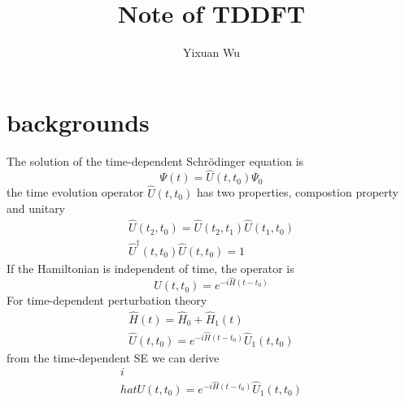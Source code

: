 \documentclass[11pt]{article}
\title{Note of TDDFT}
\author{Yixuan Wu}
\begin{document}
\maketitle
\section{backgrounds}
The solution of the time-dependent Schr\"odinger equation is
\begin{equation}
    \Psi(t)=\hat{U}(t,t_0)\Psi_0
\end{equation}
the time evolution operator $\hat{U}(t,t_0)$ has two properties, compostion property and unitary
\begin{gather}
    \hat{U}(t_2,t_0)=\hat{U}(t_2,t_1)\hat{U}(t_1,t_0)\\
    {\hat{U}}^\dagger(t,t_0)\hat{U}(t,t_0)=1
\end{gather}
If the Hamiltonian is independent of time, the operator is
\begin{equation}
    \hat{U}(t,t_0)=e^{-i\hat{H}(t-t_0)}
\end{equation}
For time-dependent perturbation theory
\begin{gather}
    \hat{H}(t)=\hat{H}_0+\hat{H}_1(t)\\
    \hat{U}(t,t_0)=e^{-i\hat{H}(t-t_0)}\hat{U}_1(t,t_0)
\end{gather}
from the time-dependent SE we can derive
\begin{gather}
    i\\hat{U}(t,t_0)=e^{-i\hat{H}(t-t_0)}\hat{U}_1(t,t_0)
\end{gather}
\end{document}
